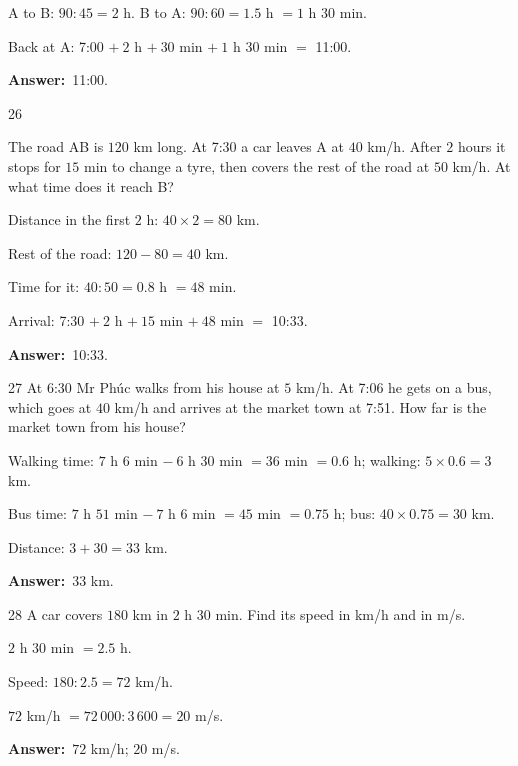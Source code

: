 \documentclass[11pt]{article}
\newif\ifsol \solfalse
\providecommand{\AnsWord}{Đáp số}
\newcommand{\dapso}[1]{\par\textbf{\AnsWord:}\ #1}
\newcommand{\probsol}[1]{%
  \begin{lrbox}{\solmeasure}\begin{minipage}{\dimexpr\linewidth-24pt\relax}#1\end{minipage}\end{lrbox}%
  \ifsol
    \begin{solbox}#1\end{solbox}%
  \else
    \setlength{\solht}{\dimexpr\ht\solmeasure+\dp\solmeasure+0.85cm\relax}%
    \ifdim\solht<1.35cm\setlength{\solht}{1.35cm}\fi
    \begin{tcolorbox}[colback=white,colframe=Line,boxrule=0.8pt,arc=5pt,
      left=8pt,right=8pt,top=4pt,bottom=4pt,height=\solht]{\footnotesize\color{Slate}\itshape\WorkWord}\end{tcolorbox}%
  \fi}
\newcommand{\gap}{\vspace{0.3cm}}
\def\WorkWord{Your work:}
\def\AnsWord{Answer}
\begin{document}
\probsol{
A to B: $90:45=2$ h. B to A: $90:60=1.5$ h $=1$ h $30$ min.\par
Back at A: 7:00 $+\ 2$ h $+\ 30$ min $+\ 1$ h $30$ min $=$ 11:00.
\dapso{11:00.}}
\gap
\begin{probbox}{26}{\relax}
\begin{minipage}[t]{0.56\linewidth}
The road AB is $120$ km long. At 7:30 a car leaves A at $40$ km/h. After $2$ hours it stops for $15$ min to change a tyre, then covers the rest of the road at $50$ km/h. At what time does it reach B?
\end{minipage}\hfill
\begin{minipage}[t]{0.4\linewidth}\vspace{4pt}\centering
{}
\end{minipage}
\end{probbox}
\probsol{
Distance in the first $2$ h: $40\times2=80$ km.\par
Rest of the road: $120-80=40$ km.\par
Time for it: $40:50=0.8$ h $=48$ min.\par
Arrival: 7:30 $+\ 2$ h $+\ 15$ min $+\ 48$ min $=$ 10:33.
\dapso{10:33.}}
\gap
\begin{probbox}{27}{\relax}
At 6:30 Mr Phúc walks from his house at $5$ km/h. At 7:06 he gets on a bus, which goes at $40$ km/h and arrives at the market town at 7:51. How far is the market town from his house?
\end{probbox}
\probsol{
Walking time: $7$ h $6$ min $-\ 6$ h $30$ min $=36$ min $=0.6$ h; walking: $5\times0.6=3$ km.\par
Bus time: $7$ h $51$ min $-\ 7$ h $6$ min $=45$ min $=0.75$ h; bus: $40\times0.75=30$ km.\par
Distance: $3+30=33$ km.
\dapso{$33$ km.}}
\gap
\begin{probbox}{28}{\relax}
A car covers $180$ km in $2$ h $30$ min. Find its speed in km/h and in m/s.
\end{probbox}
\probsol{
$2$ h $30$ min $=2.5$ h.\par
Speed: $180:2.5=72$ km/h.\par
$72$ km/h $=72\,000:3\,600=20$ m/s.
\dapso{$72$ km/h; $20$ m/s.}}
\end{document}
